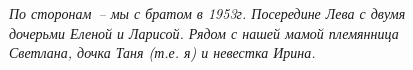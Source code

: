 \documentclass[utf8x, 12pt]{G7-32a} %
\begin{document}
\begin{figure}[h!]
\begin{minipage}[h]{100mm}
   \end{minipage}
   \hfill
    \begin{minipage}[h!]{47mm}
    \end{minipage}

    \itshape{По сторонам~-- мы с братом в 1953г. Посередине Лева с двумя дочерьми Еленой и Ларисой. Рядом с нашей мамой племянница Светлана, дочка Таня (т.е. я) и невестка Ирина.}
\end{figure}


\mainmatter %



\backmatter %



\appendix   %
\end{document}
